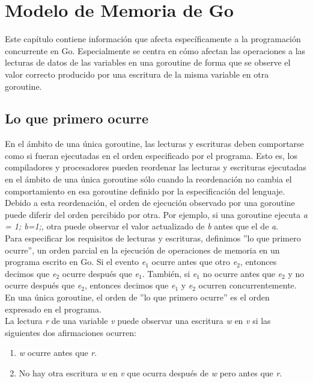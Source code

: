 
\chapter{Modelo de Memoria de Go}

Este capítulo contiene información que afecta específicamente a la programación
concurrente en Go. Especialmente se centra en cómo afectan las operaciones a las
lecturas de datos de las variables en una goroutine de forma que se observe el
valor correcto producido por una escritura de la misma variable en otra
goroutine.

\section{Lo que primero ocurre}

En el ámbito de una única goroutine, las lecturas y escrituras deben comportarse
como si fueran ejecutadas en el orden especificado por el programa. Esto es, los
compiladores y procesadores pueden reordenar las lecturas y escrituras
ejecutadas en el ámbito de una única goroutine sólo cuando la reordenación no
cambia el comportamiento en esa goroutine definido por la especificación del
lenguaje. Debido a esta reordenación, el orden de ejecución observado por una
goroutine puede diferir del orden percibido por otra. Por ejemplo, si una
goroutine ejecuta \textit{a = 1; b=1;}, otra puede observar el valor actualizado
de \textit{b} antes que el de \textit{a}.\\

Para especificar los requisitos de lecturas y escrituras, definimos ''lo que
primero ocurre'', un orden parcial en la ejecución de operaciones de memoria en
un programa escrito en Go. Si el evento \textit{e$_1$} ocurre antes que otro
\textit{e$_2$}, entonces decimos que \textit{e$_2$} ocurre después que
\textit{e$_1$}. También, si \textit{e$_1$} no ocurre antes que \textit{e$_2$}
y no ocurre después que \textit{e$_2$}, entonces decimos que \textit{e$_1$}
y \textit{e$_2$} ocurren concurrentemente.\\

En una única goroutine, el orden de ''lo que primero ocurre'' es el orden
expresado en el programa.\\

La lectura \textit{r} de una variable \textit{v} puede observar una escritura
\textit{w} en \textit{v} si las siguientes dos afirmaciones ocurren:

\begin{enumerate} \item \textit{w} ocurre antes que \textit{r}.  \item No hay
otra escritura \textit{w} en \textit{v} que ocurra después de \textit{w} pero
antes que \textit{r}.  \end{enumerate}

